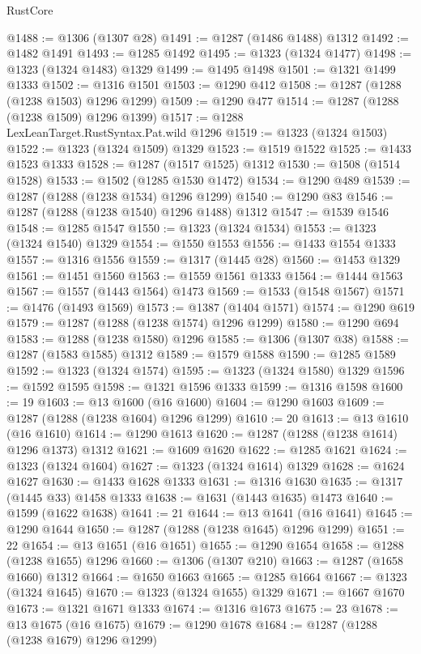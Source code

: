 \begin{lexlean}{RustCore}
\begin{coremodule}
@1488 := @1306 (@1307 @28)
@1491 := @1287 (@1486 @1488) @1312
@1492 := @1482 @1491
@1493 := @1285 @1492
@1495 := @1323 (@1324 @1477)
@1498 := @1323 (@1324 @1483) @1329
@1499 := @1495 @1498
@1501 := @1321 @1499 @1333
@1502 := @1316 @1501
@1503 := @1290 @412
@1508 := @1287 (@1288 (@1238 @1503) @1296 @1299)
@1509 := @1290 @477
@1514 := @1287 (@1288 (@1238 @1509) @1296 @1399)
@1517 := @1288 LexLeanTarget.RustSyntax.Pat.wild @1296
@1519 := @1323 (@1324 @1503)
@1522 := @1323 (@1324 @1509) @1329
@1523 := @1519 @1522
@1525 := @1433 @1523 @1333
@1528 := @1287 (@1517 @1525) @1312
@1530 := @1508 (@1514 @1528)
@1533 := @1502 (@1285 @1530 @1472)
@1534 := @1290 @489
@1539 := @1287 (@1288 (@1238 @1534) @1296 @1299)
@1540 := @1290 @83
@1546 := @1287 (@1288 (@1238 @1540) @1296 @1488) @1312
@1547 := @1539 @1546
@1548 := @1285 @1547
@1550 := @1323 (@1324 @1534)
@1553 := @1323 (@1324 @1540) @1329
@1554 := @1550 @1553
@1556 := @1433 @1554 @1333
@1557 := @1316 @1556
@1559 := @1317 (@1445 @28)
@1560 := @1453 @1329
@1561 := @1451 @1560
@1563 := @1559 @1561 @1333
@1564 := @1444 @1563
@1567 := @1557 (@1443 @1564) @1473
@1569 := @1533 (@1548 @1567)
@1571 := @1476 (@1493 @1569)
@1573 := @1387 (@1404 @1571)
@1574 := @1290 @619
@1579 := @1287 (@1288 (@1238 @1574) @1296 @1299)
@1580 := @1290 @694
@1583 := @1288 (@1238 @1580) @1296
@1585 := @1306 (@1307 @38)
@1588 := @1287 (@1583 @1585) @1312
@1589 := @1579 @1588
@1590 := @1285 @1589
@1592 := @1323 (@1324 @1574)
@1595 := @1323 (@1324 @1580) @1329
@1596 := @1592 @1595
@1598 := @1321 @1596 @1333
@1599 := @1316 @1598
@1600 := 19
@1603 := @13 @1600 (@16 @1600)
@1604 := @1290 @1603
@1609 := @1287 (@1288 (@1238 @1604) @1296 @1299)
@1610 := 20
@1613 := @13 @1610 (@16 @1610)
@1614 := @1290 @1613
@1620 := @1287 (@1288 (@1238 @1614) @1296 @1373) @1312
@1621 := @1609 @1620
@1622 := @1285 @1621
@1624 := @1323 (@1324 @1604)
@1627 := @1323 (@1324 @1614) @1329
@1628 := @1624 @1627
@1630 := @1433 @1628 @1333
@1631 := @1316 @1630
@1635 := @1317 (@1445 @33) @1458 @1333
@1638 := @1631 (@1443 @1635) @1473
@1640 := @1599 (@1622 @1638)
@1641 := 21
@1644 := @13 @1641 (@16 @1641)
@1645 := @1290 @1644
@1650 := @1287 (@1288 (@1238 @1645) @1296 @1299)
@1651 := 22
@1654 := @13 @1651 (@16 @1651)
@1655 := @1290 @1654
@1658 := @1288 (@1238 @1655) @1296
@1660 := @1306 (@1307 @210)
@1663 := @1287 (@1658 @1660) @1312
@1664 := @1650 @1663
@1665 := @1285 @1664
@1667 := @1323 (@1324 @1645)
@1670 := @1323 (@1324 @1655) @1329
@1671 := @1667 @1670
@1673 := @1321 @1671 @1333
@1674 := @1316 @1673
@1675 := 23
@1678 := @13 @1675 (@16 @1675)
@1679 := @1290 @1678
@1684 := @1287 (@1288 (@1238 @1679) @1296 @1299)

\end{coremodule}
\end{lexlean}
